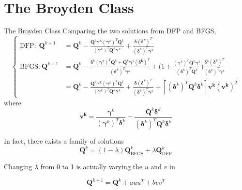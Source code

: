 \documentclass{beamer}
\begin{document}
\section{The Broyden Class}
\begin{frame}{The Broyden Class}
Comparing the two solutions from DFP and BFGS,
\begin{equation*}
\begin{cases}
		{\textrm{DFP:}}~~  \boldsymbol{Q}^{k+1}  &= \boldsymbol{Q}^k - 
    \frac{ \boldsymbol{Q}^k \boldsymbol{\gamma}^k (\boldsymbol{\gamma}^k)^T \boldsymbol{Q}^k }
    {(\boldsymbol{\gamma}^k)^T \boldsymbol{Q}^k \boldsymbol{\gamma}^k} 
    + \frac{\boldsymbol{\delta}(\boldsymbol{\delta}^k)^T}{(\boldsymbol{\delta}^k)^T \boldsymbol{\gamma}^k}\\

		{\textrm{BFGS:}}~     \boldsymbol{Q}^{k+1} &= \boldsymbol{Q}^k - 
    \frac{\boldsymbol{\delta}^k (\boldsymbol{\gamma}^k)^T \boldsymbol{Q}^k + \boldsymbol{Q}^k\boldsymbol{\gamma}^k (\boldsymbol{\delta^k})^T}
    {(\boldsymbol{\delta}^k)^T \boldsymbol{\gamma}^k} 
    + \bigg(1 + \frac{(\boldsymbol{\gamma}^k)^T \boldsymbol{Q}^k \boldsymbol{\gamma}^k}{(\boldsymbol{\delta}^k)^T \boldsymbol{Q}^k}\bigg)
    \frac{\boldsymbol{\delta}^k (\boldsymbol{\delta}^k)^T}{(\boldsymbol{\delta}^k)^T \boldsymbol{\gamma}^k}\\
    & = \boldsymbol{Q}^k - 
        \frac{ \boldsymbol{Q}^k \boldsymbol{\gamma}^k (\boldsymbol{\gamma}^k)^T \boldsymbol{Q}^k }
    {(\boldsymbol{\gamma}^k)^T \boldsymbol{Q}^k \boldsymbol{\gamma}^k} + 
    \frac{\boldsymbol{\delta}(\boldsymbol{\delta}^k)^T}{(\boldsymbol{\delta}^k)^T \boldsymbol{\gamma}^k}
    + [(\boldsymbol{\delta}^k)^T \boldsymbol{Q}^k  \boldsymbol{\delta}^k] \boldsymbol{v^k}(\boldsymbol{v^k})^T

\end{cases}
\end{equation*}
where
\begin{equation*}
    \boldsymbol{v^k} = \frac{\boldsymbol{\gamma}^k }{(\boldsymbol{\gamma}^k) ^T \boldsymbol{\delta}^k } -
    \frac{\boldsymbol{Q}^k\boldsymbol{\delta}^k }{(\boldsymbol{\delta}^k) ^T \boldsymbol{Q}^k\boldsymbol{\delta}^k }  
\end{equation*}

In fact, there exists a family of solutions
\begin{equation*}
    \boldsymbol{Q}^k = (1-\lambda) \boldsymbol{Q}^k_{\textrm{BFGS}} + \lambda \boldsymbol{Q}^k_{\textrm{DFP}}
\end{equation*}

Changing $\lambda$ from 0 to 1 is actually varying the $u$ and $v$ in 

\begin{equation*}
    \boldsymbol{Q}^{k+1} = \boldsymbol{Q}^{k} + a uu^T + bvv^T
\end{equation*}

\end{frame}
\end{document}
